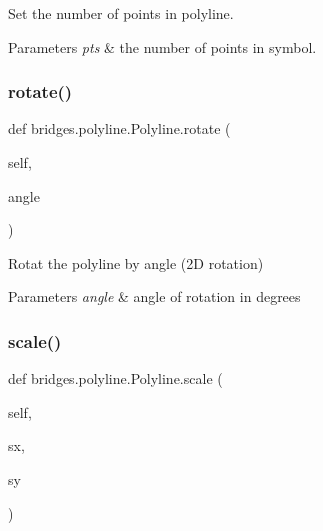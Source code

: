 Set the number of points in polyline. 


\begin{DoxyParams}{Parameters}
{\em pts} & the number of points in symbol. \\
\hline
\end{DoxyParams}
\mbox{\label{classbridges_1_1polyline_1_1_polyline_ab72d0a3cfdc4c3a7efec194f54f8a14a}} 
\subsubsection{\texorpdfstring{rotate()}{rotate()}}
{\footnotesize\ttfamily def bridges.\+polyline.\+Polyline.\+rotate (\begin{DoxyParamCaption}\item[{}]{self,  }\item[{}]{angle }\end{DoxyParamCaption})}



Rotat the polyline by \textquotesingle{}angle\textquotesingle{} (2D rotation) 


\begin{DoxyParams}{Parameters}
{\em angle} & angle of rotation in degrees \\
\hline
\end{DoxyParams}
\mbox{\label{classbridges_1_1polyline_1_1_polyline_a2727d3d6fa9da5ea738c51f822da16ae}} 
\subsubsection{\texorpdfstring{scale()}{scale()}}
{\footnotesize\ttfamily def bridges.\+polyline.\+Polyline.\+scale (\begin{DoxyParamCaption}\item[{}]{self,  }\item[{}]{sx,  }\item[{}]{sy }\end{DoxyParamCaption})}




